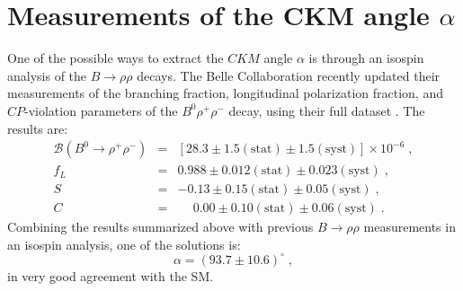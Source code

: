 \section{Measurements of the CKM angle $\alpha$}
\label{sec:alpha}

One of the possible ways to extract the $CKM$ angle $\alpha$ is through
an isospin analysis of the $B \to \rho\rho$ decays. The Belle Collaboration
recently updated their measurements of the branching fraction, longitudinal
polarization fraction, and $CP$-violation parameters of the $B^0 \rho^+\rho^-$
decay, using their full dataset \cite{belle_rhorho}. The results are:
\begin{eqnarray}
  \mathcal{B} (B^0 \to \rho^+\rho^-) & = & [28.3 \pm 1.5 (\mbox{stat}) \pm 1.5 (\mbox{syst})] \times 10^{-6} \; , \\ 
  f_L & = & 0.988 \pm 0.012 (\mbox{stat}) \pm 0.023 (\mbox{syst}) \; , \\
  S & = & -0.13 \pm 0.15 (\mbox{stat}) \pm 0.05 (\mbox{syst}) \; , \\
  C & = & \phantom{-}0.00 \pm 0.10 (\mbox{stat}) \pm 0.06 (\mbox{syst}) \; .
\end{eqnarray}
Combining the results summarized above with previous $B \to \rho\rho$
measurements in an isospin analysis, one of the solutions is:
\begin{equation}
  \alpha = (93.7 \pm 10.6)^{\circ} \; ,
\end{equation}
in very good agreement with the SM.
